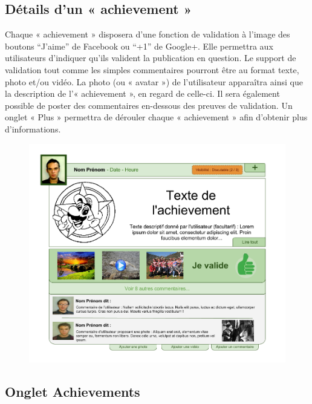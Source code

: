 \documentclass{life-fr}
\begin{document}
\newpage

\subsection{Détails d'un « achievement »}

Chaque « achievement » disposera d'une fonction de validation à l'image des boutons ``J'aime'' de Facebook ou ``+1'' de Google+. Elle permettra aux utilisateurs d'indiquer qu'ils valident la publication en question. Le support de validation tout comme les simples commentaires pourront être au format texte, photo et/ou vidéo. La photo (ou « avatar ») de l'utilisateur apparaîtra ainsi que la description de l'« achievement », en regard de celle-ci. Il sera également possible de poster des commentaires en-dessous des preuves de validation. Un onglet « Plus » permettra de dérouler chaque « achievement » afin d'obtenir plus d'informations.\\

\begin{figure}[H]
  \begin{center}
    \includegraphics[width=15cm]{img/achievement.png}
  \end{center}
\end{figure}

\subsection{Onglet Achievements}
\end{document}
